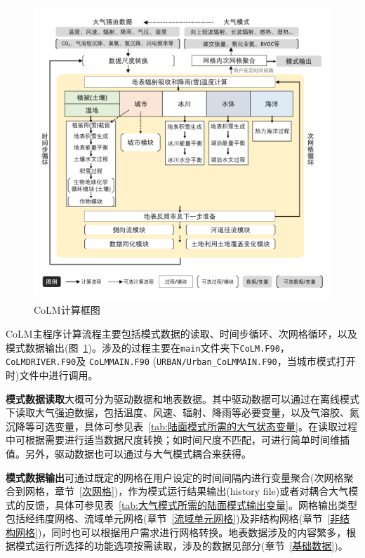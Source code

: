 {
  \begin{figure}[htbp]
    \centering
    \includegraphics[width=\textwidth]{Figures/模式构架/CoLM计算框图_v5.png}
    \caption{CoLM计算框图}
    \label{fig:CoLM计算框图}
  \end{figure}
}

CoLM主程序计算流程主要包括模式数据的读取、时间步循环、次网格循环，以及模式数据输出(图~\ref{fig:CoLM计算框图})。涉及的过程主要在\texttt{main}文件夹下\texttt{CoLM.F90}，\texttt{CoLMDRIVER.F90}及 \allowbreak \texttt{CoLMMAIN.F90}
\allowbreak (\texttt{URBAN\allowbreak /Urban\allowbreak \_CoLMMAIN.F90}，当城市模式打开时)文件中进行调用。

\textbf{模式数据读取}大概可分为驱动数据和地表数据。其中驱动数据可以通过在离线模式下读取大气强迫数据，包括温度、风速、辐射、降雨等必要变量，以及气溶胶、氮沉降等可选变量，具体可参见表~\ref{tab:陆面模式所需的大气状态变量}。在读取过程中可根据需要进行适当数据尺度转换；如时间尺度不匹配，可进行简单时间维插值。另外，驱动数据也可以通过与大气模式耦合来获得。

\textbf{模式数据输出}可通过既定的网格在用户设定的时间间隔内进行变量聚合(次网格聚合到网格，章节~\ref{次网格})，作为模式运行结果输出(history file)或者对耦合大气模式的反馈，具体可参见表~\ref{tab:大气模式所需的陆面模式输出变量}。网格输出类型包括经纬度网格、流域单元网格(章节~\ref{流域单元网格})及非结构网格(章节~\ref{非结构网格})，同时也可以根据用户需求进行网格转换。地表数据涉及的内容繁多，根据模式运行所选择的功能选项按需读取，涉及的数据见部分(章节~\ref{基础数据})。

